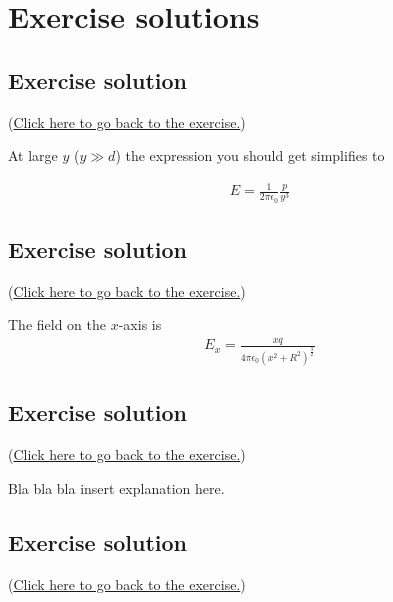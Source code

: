 \documentclass[
]{book}
\theoremstyle{definition}
\theoremstyle{definition}
\theoremstyle{definition}
\theoremstyle{definition}
\theoremstyle{remark}
\begin{document}
\hypertarget{sec:Sols}{%
\chapter{Exercise solutions}\label{sec:Sols}}

\hypertarget{ex1Sol}{%
\section*{Exercise solution}\label{ex1Sol}}

(\protect\hyperlink{dipoleEx}{Click here to go back to the exercise.})

At large \(y\) (\(y \gg d\)) the expression you should get simplifies to

\[\begin{aligned}
E = \frac{1}{2 \pi \epsilon_0} \frac{p}{y^3}
\end{aligned}\]

\hypertarget{ringExSol}{%
\section*{Exercise solution}\label{ringExSol}}

(\protect\hyperlink{ringEx}{Click here to go back to the exercise.})

The field on the \(x\)-axis is \[\begin{aligned}
E_x = \frac{xq}{4 \pi\epsilon_0 (x^2 + R^2)^{\frac{3}{2}}}
\end{aligned}\]

\hypertarget{ringEx2Sol}{%
\section*{Exercise solution}\label{ringEx2Sol}}

(\protect\hyperlink{ringEx2}{Click here to go back to the exercise.})

Bla bla bla insert explanation here.

\hypertarget{GaussLineExSol}{%
\section*{Exercise solution}\label{GaussLineExSol}}

(\protect\hyperlink{GaussLineEx}{Click here to go back to the exercise.})
\end{document}
